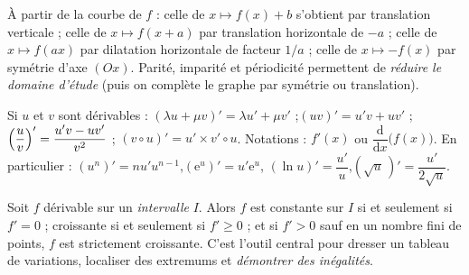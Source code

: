 \begin{propriete}
À partir de la courbe de $f$ : celle de $x\mapsto f(x)+b$ s'obtient par
translation verticale ; celle de $x\mapsto f(x+a)$ par translation
horizontale de $-a$ ; celle de $x\mapsto f(ax)$ par dilatation horizontale
de facteur $1/a$ ; celle de $x\mapsto-f(x)$ par symétrie d'axe $(Ox)$.
Parité, imparité et périodicité permettent de \emph{réduire le domaine
d'étude} (puis on complète le graphe par symétrie ou translation).
\end{propriete}


\begin{propriete}
Si $u$ et $v$ sont dérivables :
$(\lambda u+\mu v)'=\lambda u'+\mu v'$ ;\quad $(uv)'=u'v+uv'$ ;\quad
$\Bigl(\dfrac{u}{v}\Bigr)'=\dfrac{u'v-uv'}{v^{2}}$ ;\quad
$(v\circ u)'=u'\times v'\circ u$. Notations : $f'(x)$ ou
$\dfrac{\mathrm{d}}{\mathrm{d}x}\bigl(f(x)\bigr)$.
En particulier :
$(u^{n})'=nu'u^{n-1}$,\quad $(\mathrm{e}^{u})'=u'\mathrm{e}^{u}$,\quad
$(\ln u)'=\dfrac{u'}{u}$,\quad $(\sqrt{u}\,)'=\dfrac{u'}{2\sqrt{u}}$.
\end{propriete}

\begin{theoreme}
Soit $f$ dérivable sur un \emph{intervalle} $I$. Alors $f$ est constante sur
$I$ si et seulement si $f'=0$ ; croissante si et seulement si $f'\geq0$ ;
et si $f'>0$ sauf en un nombre fini de points, $f$ est strictement
croissante. C'est l'outil central pour dresser un tableau de variations,
localiser des extremums et \emph{démontrer des inégalités}.
\end{theoreme}

